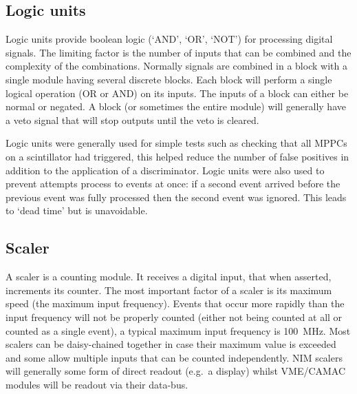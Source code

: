 
\subsection{Logic units} %
\label{ssub:logic_units}
Logic units provide boolean logic (`AND', `OR', `NOT') for processing digital signals. The limiting factor is the number of inputs that can be combined and the complexity of the combinations. Normally signals are combined in a block with a single module having several discrete blocks. Each block will perform a single logical operation (OR or AND) on its inputs. The inputs of a block can either be normal or negated. A block (or sometimes the entire module) will generally have a veto signal that will stop outputs until the veto is cleared.

Logic units were generally used for simple tests such as checking that all MPPCs on a scintillator had triggered, this helped reduce the number of false positives in addition to the application of a discriminator. Logic units were also used to prevent attempts process to events at once: if a second event arrived before the previous event was fully processed then the second event was ignored. This leads to `dead time' but is unavoidable.

\subsection{Scaler} %
\label{ssub:scaler}
A scaler is a counting module. It receives a digital input, that when asserted, increments its counter. The most important factor of a scaler is its maximum speed (the maximum input frequency). Events that occur more rapidly than the input frequency will not be properly counted (either not being counted at all or counted as a single event), a typical maximum input frequency is 100~MHz. Most scalers can be daisy-chained together in case their maximum value is exceeded and some allow multiple inputs that can be counted independently. NIM scalers will generally some form of direct readout (e.g.\ a display) whilst VME/CAMAC modules will be readout via their data-bus. 

